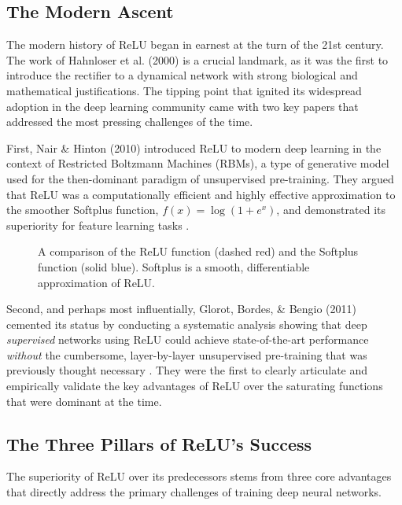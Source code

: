 \subsection{The Modern Ascent}
The modern history of ReLU began in earnest at the turn of the 21st century. The work of Hahnloser et al. (2000) is a crucial landmark, as it was the first to introduce the rectifier to a dynamical network with strong biological and mathematical justifications. The tipping point that ignited its widespread adoption in the deep learning community came with two key papers that addressed the most pressing challenges of the time.

First, Nair \& Hinton (2010) introduced ReLU to modern deep learning in the context of Restricted Boltzmann Machines (RBMs), a type of generative model used for the then-dominant paradigm of unsupervised pre-training. They argued that ReLU was a computationally efficient and highly effective approximation to the smoother Softplus function, $f(x) = \log(1+e^x)$, and demonstrated its superiority for feature learning tasks \cite{NairHinton2010ReLU}.

\begin{figure}[h!]
    \centering
    \scalebox{1.0}{\softplusplot}
    \caption{A comparison of the ReLU function (dashed red) and the Softplus function (solid blue). Softplus is a smooth, differentiable approximation of ReLU.}
    \label{fig:softplus_plot}
\end{figure}

Second, and perhaps most influentially, Glorot, Bordes, \& Bengio (2011) cemented its status by conducting a systematic analysis showing that deep \textit{supervised} networks using ReLU could achieve state-of-the-art performance \textit{without} the cumbersome, layer-by-layer unsupervised pre-training that was previously thought necessary \cite{GlorotBordesBengio2011DeepSparse}. They were the first to clearly articulate and empirically validate the key advantages of ReLU over the saturating functions that were dominant at the time.

\subsection{The Three Pillars of ReLU's Success}
The superiority of ReLU over its predecessors stems from three core advantages that directly address the primary challenges of training deep neural networks.


